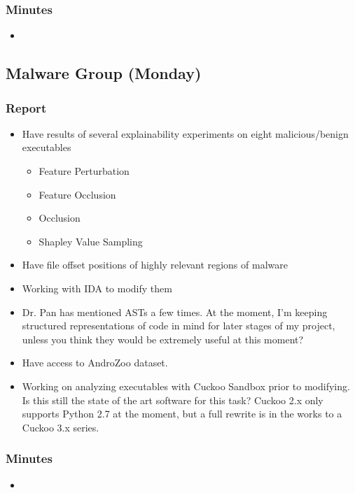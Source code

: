 \documentclass{article}
\begin{document}
\subsubsection*{Minutes}
\begin{itemize}
	\item 
\end{itemize}

\subsection*{Malware Group (Monday)}
\subsubsection*{Report}
\begin{itemize}
	\item Have results of several explainability experiments on eight malicious/benign executables
	\begin{itemize}
		\item Feature Perturbation
		\item Feature Occlusion
		\item Occlusion
		\item Shapley Value Sampling
	\end{itemize}
	\item Have file offset positions of highly relevant regions of malware
	\item Working with IDA to modify them
	\item Dr. Pan has mentioned ASTs a few times. At the moment, I'm keeping structured representations of code in mind for later stages of my project, unless you think they would be extremely useful at this moment?
	\item Have access to AndroZoo dataset.
	\item Working on analyzing executables with Cuckoo Sandbox prior to modifying. Is this still the state of the art software for this task? Cuckoo 2.x only supports Python 2.7 at the moment, but a full rewrite is in the works to a Cuckoo 3.x series.
\end{itemize}
\subsubsection*{Minutes}
\begin{itemize}
	\item 
\end{itemize}

\pagebreak
\end{document}
